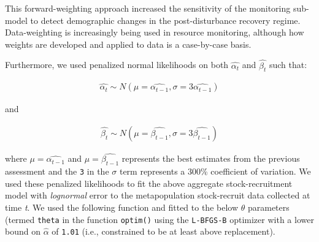 \documentclass[
]{article}
\begin{document}
This forward-weighting approach increased the sensitivity of the
monitoring sub-model to detect demographic changes in the
post-disturbance recovery regime. Data-weighting is increasingly being
used in resource monitoring, although how weights are developed and
applied to data is a case-by-case basis.

Furthermore, we used penalized normal likelihoods on both
\(\hat{\alpha_t}\) and \(\hat{\beta_t}\) such that:

\begin{align}
\hat{\alpha_t} \sim N(\mu=\hat{\alpha_{t-1}},\sigma=3\hat{\alpha_{t-1}})
\end{align}

and

\begin{align}
\hat{\beta_t} \sim N(\mu=\hat{\beta_{t-1}},\sigma=3\hat{\beta_{t-1}})
\end{align}

where \(\mu=\hat{\alpha_{t-1}}\) and \(\mu=\hat{\beta_{t-1}}\)
represents the best estimates from the previous assessment and the
\texttt{3} in the \(\sigma\) term represents a 300\% coefficient of
variation. We used these penalized likelihoods to fit the above
aggregate stock-recruitment model with \emph{lognormal} error to the
metapopulation stock-recruit data collected at time \emph{t}. We used
the following function and fitted to the below \(\theta\) parameters
(termed \texttt{theta} in the function \texttt{optim()} using the
\texttt{L-BFGS-B} optimizer with a lower bound on \(\hat{\alpha}\) of
\texttt{1.01} (i.e., constrained to be at least above replacement).
\end{document}
